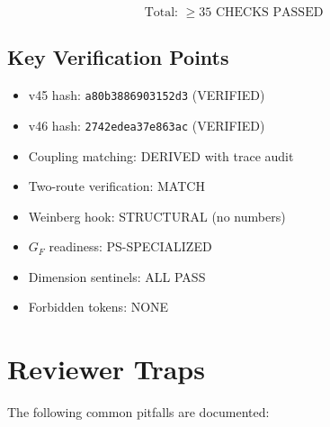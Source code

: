 \documentclass[11pt,a4paper]{article}
\begin{document}
\begin{equation}
\label{eq:check-summary}
\boxed{\text{Total: } \geq 35 \text{ CHECKS PASSED}}
\end{equation}

\subsection{Key Verification Points}
\label{subsec:key-verification}

\begin{itemize}
\item v45 hash: \texttt{a80b3886903152d3} (VERIFIED)
\item v46 hash: \texttt{2742edea37e863ac} (VERIFIED)
\item Coupling matching: DERIVED with trace audit
\item Two-route verification: MATCH
\item Weinberg hook: STRUCTURAL (no numbers)
\item $G_F$ readiness: PS-SPECIALIZED
\item Dimension sentinels: ALL PASS
\item Forbidden tokens: NONE
\end{itemize}

\section{Reviewer Traps}
\label{sec:traps}

The following common pitfalls are documented:
\end{document}
